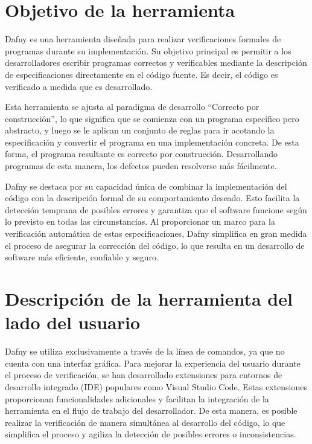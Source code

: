 \documentclass[runningheads]{llncs}
\begin{document}
\section{Objetivo de la herramienta}

Dafny es una herramienta diseñada para realizar verificaciones formales de programas durante su implementación.
Su objetivo principal es permitir a los desarrolladores escribir programas correctos y verificables mediante la descripción
de especificaciones directamente en el código fuente. Es decir, el código es verificado a medida que es desarrollado.

Esta herramienta se ajusta al paradigma de desarrollo ``Correcto por construcción'', lo que significa que se comienza
con un programa específico pero abstracto, y luego se le aplican un conjunto de reglas para ir acotando la especificación
y convertir el programa en una implementación concreta. De esta forma, el programa resultante es correcto por construcción.
Desarrollando programas de esta manera, los defectos pueden resolverse más fácilmente.

Dafny se destaca por su capacidad única de combinar la implementación del código con la descripción formal de su comportamiento
deseado. Esto facilita la detección temprana de posibles errores y garantiza que el software funcione según lo previsto en todas
las circunstancias. Al proporcionar un marco para la verificación automática de estas especificaciones, Dafny simplifica en gran
medida el proceso de asegurar la corrección del código, lo que resulta en un desarrollo de software más eficiente, confiable y seguro.

\section{Descripción de la herramienta del lado del usuario}

Dafny se utiliza exclusivamente a través de la línea de comandos, ya que no cuenta con una interfaz gráfica.
Para mejorar la experiencia del usuario durante el proceso de verificación, se han desarrollado extensiones para entornos de desarrollo integrado (IDE) populares como Visual Studio Code.
Estas extensiones proporcionan funcionalidades adicionales y facilitan la integración de la herramienta en el flujo de trabajo del desarrollador.
De esta manera, es posible realizar la verificación de manera simultánea al desarrollo del código, lo que simplifica el proceso y agiliza la detección de posibles errores o inconsistencias.
\end{document}
